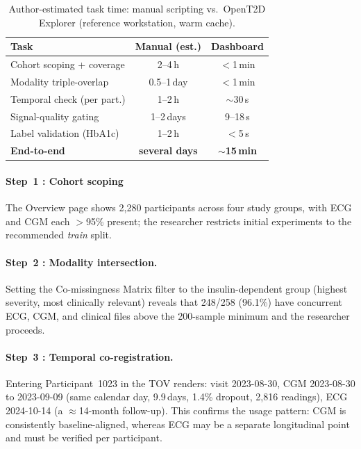 \documentclass[conference]{IEEEtran}
\begin{document}
\begin{table}[t]
    \centering
    \caption{Author-estimated task time: manual scripting vs.\ OpenT2D Explorer (reference workstation, warm cache).}
    \label{tab:timesavings}
    \begin{tabular}{@{} l c c @{}}
        \hline
        \textbf{Task} & \textbf{Manual (est.)} & \textbf{Dashboard} \\
        \hline
        Cohort scoping + coverage     & 2--4\,h        & $<$1\,min \\
        Modality triple-overlap       & 0.5--1\,day    & $<$1\,min \\
        Temporal check (per part.)    & 1--2\,h        & $\sim$30\,s \\
        Signal-quality gating         & 1--2\,days     & 9--18\,s \\
        Label validation (HbA1c)      & 1--2\,h        & $<$5\,s \\
        \hline
        \textbf{End-to-end}           & \textbf{several days} & \textbf{$\sim$15\,min} \\
        \hline
    \end{tabular}
\end{table}

\paragraph{Step~1 : Cohort scoping} The Overview page shows 2,280 participants across four study groups, with ECG and CGM each $>$95\% present; the researcher restricts initial experiments to the recommended \emph{train} split.

\paragraph{Step~2 : Modality intersection.} Setting the Co-missingness Matrix filter to the insulin-dependent group (highest severity, most clinically relevant) reveals that 248/258 (96.1\%) have concurrent ECG, CGM, and clinical files above the 200-sample minimum and the researcher proceeds.

\paragraph{Step~3 : Temporal co-registration.} Entering Participant~1023 in the TOV renders: visit 2023-08-30, CGM 2023-08-30 to 2023-09-09 (same calendar day, 9.9\,days, 1.4\% dropout, 2,816 readings), ECG 2024-10-14 (a $\approx$14-month follow-up). This confirms the usage pattern: CGM is consistently baseline-aligned, whereas ECG may be a separate longitudinal point and must be verified per participant.
\end{document}
